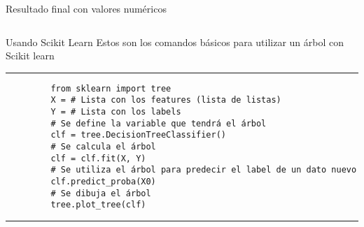 \documentclass[aspectratio=169]{beamer}
\begin{document}
%
\begin{frame}{Resultado final con valores numéricos}
	\begin{columns}
		\begin{column}{0.5\textwidth}
			\begin{center}
				
			\end{center}
		\end{column}
	\begin{column}{0.5\textwidth}
		\begin{center}
			
		\end{center}
	\end{column}
	\end{columns}
\end{frame}
%
\begin{frame}[fragile]{Usando Scikit Learn}
	Estos son los comandos básicos para utilizar un árbol con Scikit learn
	\rule{\textwidth}{1pt}
	\scriptsize
	\begin{verbatim}
		 from sklearn import tree
		 X = # Lista con los features (lista de listas)
		 Y = # Lista con los labels
		 # Se define la variable que tendrá el árbol
		 clf = tree.DecisionTreeClassifier()
		 # Se calcula el árbol
		 clf = clf.fit(X, Y)
		 # Se utiliza el árbol para predecir el label de un dato nuevo
		 clf.predict_proba(X0)
		 # Se dibuja el árbol
		 tree.plot_tree(clf)
	\end{verbatim}
	\rule{\textwidth}{1pt}
\end{frame}
%
\begin{frame}[plain]
	\maketitle
\end{frame}
\end{document}
